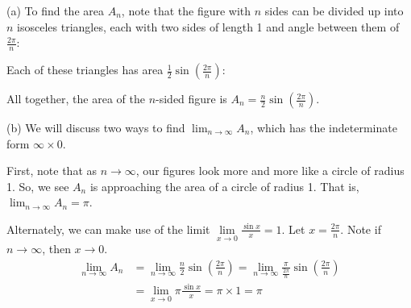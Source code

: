 \begin{solution}
\noindent (a)
To find the area $A_n$, note that the figure with $n$ sides can be divided up into $n$ isosceles triangles, each with two sides of length 1 and angle between them of $\frac{2\pi}{n}$:

\begin{center}
\end{center}
Each of these triangles has area $\frac{1}{2}\sin\left(\frac{2\pi}{n}\right)$:
\begin{center}
\end{center}

All together, the area of the $n$-sided figure is $A_n = \displaystyle\frac{n}{2}\sin\left(\frac{2\pi}{n}\right)$.

\noindent(b)
We will discuss two ways to find $\displaystyle\lim_{n \to \infty} A_n$, which has the indeterminate form $\infty \times 0$.

First, note that as $n \to \infty$, our figures look more and more like a circle of radius 1. So, we see $A_n$ is approaching the area of a circle of radius 1. That is, $\displaystyle\lim_{n \to \infty}A_n = \pi$.

Alternately, we can make use of the limit $\lim\limits_{x \to 0}\frac{\sin x}{x}=1$. Let $x=\frac{2\pi}{n}$. Note if $n \to \infty$, then $x \to 0$.
\begin{align*}
\lim_{n \to \infty}A_n&=\lim_{n \to \infty}\frac{n}{2}\sin\left(\frac{2\pi}{n}\right)
 = \lim_{n \to \infty}\frac{\pi}{\frac{2\pi}{n}}\sin\left(\frac{2\pi}{n}\right) \\
 &=\lim_{x \to 0}\pi\frac{\sin x}{x} =\pi\times 1=\pi
\end{align*}
\end{solution}

